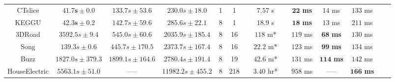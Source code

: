 \begin{tabular}{ cccccccccccccc }
	CTslice              &       $\mathbf{41.7s}\pm 0.0$ &     $133.7s\pm 53.6$            &     $230.0s\pm 18.0$  & 1 & 1     & & $7.57$ s   && $\mathbf{22}$ \textbf{ms}   & $       {14}$ ms       & $133$ ms \\
	KEGGU                &       $\mathbf{42.3s}\pm 0.2$ &     $142.7s\pm 59.6$            &     $285.6s\pm 22.1$  & 8 & 1     & & $18.9$ s    && $\mathbf{18}$ \textbf{ms}   & $       {13}$ ms       & $211$ ms \\
	3DRoad               &       $3592.5s\pm 9.4$       &     $\mathbf{545.0}s\pm 60.6$   &   $2035.9s\pm 185.4$  & 8 & 16     & & $118$ m*     && ${119}$ ms                  & $\mathbf{68}$ \bf ms   & $130$ ms \\
	Song                 &      $\mathbf{139.3}s\pm 0.6$ &    $445.7s\pm 170.5$            &   $2373.7s\pm 167.4$  & 8 & 16    & & $22.2$ m*   && ${123}$ ms                  & $\mathbf{99}$ \bf ms   & $134$ ms \\
	Buzz                 &  $\mathbf{1827.0}s\pm 379.3$ &   $1899.1s\pm 164.6$            &   $2780.4s\pm 191.4$  & 8 & 19     & & $42.6$ m*   && ${131}$ ms                  & $\mathbf{114}$ \bf ms  & $142$ ms \\
	HouseElectric        &     $\mathbf{5563.1}s\pm 51.0$ &   -----                        &  $11982.2s\pm 455.2$  & 8 & 218   & & $3.40$ hr*   && ${958}$ ms                  & -----                  & $\mathbf{166}$ \textbf{ms} \\
  \bottomrule
\end{tabular}
